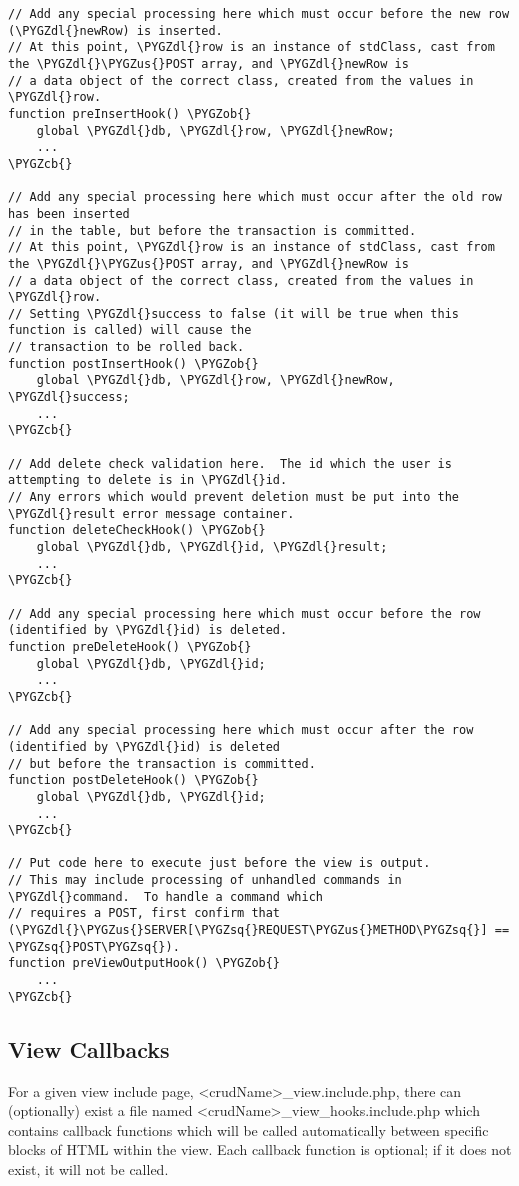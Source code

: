 \documentclass[letterpaper,10pt,english]{sphinxmanual}
\def\PYGZus{\char`\_}
\def\PYGZob{\char`\{}
\def\PYGZcb{\char`\}}
\def\PYGZdl{\char`\$}
\def\PYGZsq{\char`\'}
\renewcommand\PYGZsq{\textquotesingle}
\begin{document}
\begin{Verbatim}[commandchars=\\\{\}]
// Add any special processing here which must occur before the new row (\PYGZdl{}newRow) is inserted.
// At this point, \PYGZdl{}row is an instance of stdClass, cast from the \PYGZdl{}\PYGZus{}POST array, and \PYGZdl{}newRow is
// a data object of the correct class, created from the values in \PYGZdl{}row.
function preInsertHook() \PYGZob{}
    global \PYGZdl{}db, \PYGZdl{}row, \PYGZdl{}newRow;
    ...
\PYGZcb{}

// Add any special processing here which must occur after the old row has been inserted
// in the table, but before the transaction is committed.
// At this point, \PYGZdl{}row is an instance of stdClass, cast from the \PYGZdl{}\PYGZus{}POST array, and \PYGZdl{}newRow is
// a data object of the correct class, created from the values in \PYGZdl{}row.
// Setting \PYGZdl{}success to false (it will be true when this function is called) will cause the
// transaction to be rolled back.
function postInsertHook() \PYGZob{}
    global \PYGZdl{}db, \PYGZdl{}row, \PYGZdl{}newRow, \PYGZdl{}success;
    ...
\PYGZcb{}

// Add delete check validation here.  The id which the user is attempting to delete is in \PYGZdl{}id.
// Any errors which would prevent deletion must be put into the \PYGZdl{}result error message container.
function deleteCheckHook() \PYGZob{}
    global \PYGZdl{}db, \PYGZdl{}id, \PYGZdl{}result;
    ...
\PYGZcb{}

// Add any special processing here which must occur before the row (identified by \PYGZdl{}id) is deleted.
function preDeleteHook() \PYGZob{}
    global \PYGZdl{}db, \PYGZdl{}id;
    ...
\PYGZcb{}

// Add any special processing here which must occur after the row (identified by \PYGZdl{}id) is deleted
// but before the transaction is committed.
function postDeleteHook() \PYGZob{}
    global \PYGZdl{}db, \PYGZdl{}id;
    ...
\PYGZcb{}

// Put code here to execute just before the view is output.
// This may include processing of unhandled commands in \PYGZdl{}command.  To handle a command which
// requires a POST, first confirm that (\PYGZdl{}\PYGZus{}SERVER[\PYGZsq{}REQUEST\PYGZus{}METHOD\PYGZsq{}] == \PYGZsq{}POST\PYGZsq{}).
function preViewOutputHook() \PYGZob{}
    ...
\PYGZcb{}
\end{Verbatim}


\subsection{View Callbacks}
\label{jaxFrameworkGuide:view-callbacks}
For a given view include page, \textless{}crudName\textgreater{}\_view.include.php, there can (optionally) exist a file
named \textless{}crudName\textgreater{}\_view\_hooks.include.php which contains callback functions which will be called
automatically between specific blocks of HTML within the view.  Each callback function is optional;
if it does not exist, it will not be called.
\end{document}
